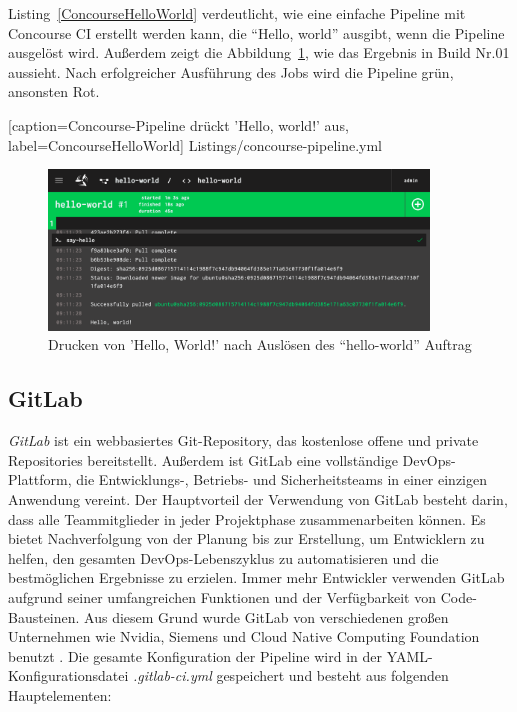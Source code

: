 Listing~\ref{ConcourseHelloWorld} verdeutlicht, wie eine einfache Pipeline mit Concourse CI erstellt werden kann, die “Hello, world” ausgibt, wenn die Pipeline ausgelöst wird. Außerdem zeigt die Abbildung~\ref{fig:ConcourseHelloWorld}, wie das Ergebnis in Build Nr.01 aussieht. Nach erfolgreicher Ausführung des Jobs wird die Pipeline grün, ansonsten Rot.


[caption={Concourse-Pipeline drückt 'Hello, world!' aus}, label=ConcourseHelloWorld]
{Listings/concourse-pipeline.yml}

\begin{figure}[!htbp]%
	\centering
	\includegraphics[width=0.9\textwidth]{Graphics/concourse-ci-job-success.png}
	\caption{Drucken von 'Hello, World!' nach Auslösen des “hello-world” Auftrag}
	\label{fig:ConcourseHelloWorld}
\end{figure}

\subsection{GitLab}\label{sub:gitlab}

\textit{GitLab} ist ein webbasiertes Git-Repository, das kostenlose offene und private Repositories bereitstellt. 
Außerdem ist GitLab eine vollständige DevOps-Plattform, die Entwicklungs-, Betriebs- und Sicherheitsteams in einer einzigen Anwendung vereint. Der Hauptvorteil der Verwendung von GitLab besteht darin, dass alle Teammitglieder in jeder Projektphase zusammenarbeiten können. Es bietet Nachverfolgung von der Planung bis zur Erstellung, um Entwicklern zu helfen, den gesamten DevOps-Lebenszyklus zu automatisieren und die bestmöglichen Ergebnisse zu erzielen. Immer mehr Entwickler verwenden GitLab aufgrund seiner umfangreichen Funktionen und der Verfügbarkeit von Code-Bausteinen. Aus diesem Grund wurde GitLab von verschiedenen großen Unternehmen wie Nvidia, Siemens und Cloud Native Computing Foundation benutzt \cite{GitLab:about}. 
\newline \newline
Die gesamte Konfiguration der Pipeline wird in der YAML-Konfigurationsdatei \textit{.gitlab-ci.yml} gespeichert und besteht aus folgenden Hauptelementen:

